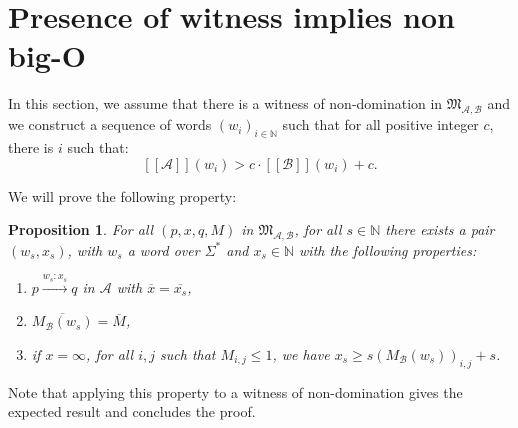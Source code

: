 \documentclass[10pt,a4paper]{amsart}
\newtheorem{prop}[prop]{Proposition}
\theoremstyle{definition}
\numberwithin{equation}{section}
\theoremstyle{remark}
\newcommand{\N}{\mathbb{N}}
\newcommand{\ideal}{\mathfrak{M}}
\newcommand{\autA}{\mathcal{A}}
\newcommand{\autB}{\mathcal{B}}
\newcommand{\brfunc}[1]{[\![#1]\!]}
\newcommand{\funcA}{\brfunc{\autA}}
\newcommand{\funcB}{\brfunc{\autB}}
\theoremstyle{remark}
\begin{document}
\section{Presence of witness implies non big-O}
\label{2implies1}
\setcounter{case}{0}

In this section, we assume that there is a witness of non-domination in  $\ideal_{\autA,\autB}$ and we construct a sequence of words $(w_i)_{i\in \mathbb{N}}$ such that for all positive integer $c$, there is $i$ such that: 
\[
\funcA(w_i) > c\cdot \funcB(w_i) + c.
\]

We will prove the following property:

\begin{prop}
\label{prop:words-construct}
For all $(p,x,q,M)$ in $\ideal_{\autA,\autB}$, for all $s\in \N$ there exists a pair $(w_s,x_s)$, with $w_s$ a word over $\Sigma^*$ and $x_s\in \N$ with the following properties: 
\begin{enumerate}[label={\normalfont(\arabic*)}]
\item $p \xrightarrow{w_s:x_s} q$ in $\autA$ with $\overline{x} = \overline {x_s}$,
\item $\overline{M_\autB(w_s)} = \overline{M}$,  
\item if $x = \infty$, for all $i,j$ such that $M_{i,j} \leq 1$, we have $x_s \geq s (M_\autB(w_s))_{i,j} + s$.
\end{enumerate}
\end{prop}

Note that applying this property to a witness of non-domination gives the expected result and concludes the proof.
\end{document}
